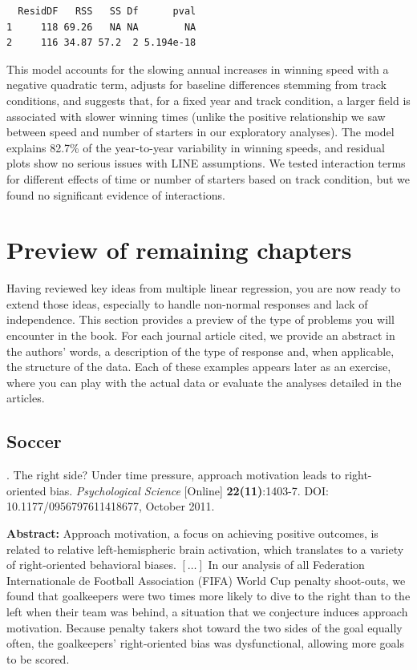 \documentclass[
]{krantz}
\renewenvironment{quote}{\begin{VF}}{\end{VF}}
\begin{document}
\begin{verbatim}
  ResidDF   RSS   SS Df      pval
1     118 69.26   NA NA        NA
2     116 34.87 57.2  2 5.194e-18
\end{verbatim}

This model accounts for the slowing annual increases in winning speed with a negative quadratic term, adjusts for baseline differences stemming from track conditions, and suggests that, for a fixed year and track condition, a larger field is associated with slower winning times (unlike the positive relationship we saw between speed and number of starters in our exploratory analyses). The model explains 82.7\% of the year-to-year variability in winning speeds, and residual plots show no serious issues with LINE assumptions. We tested interaction terms for different effects of time or number of starters based on track condition, but we found no significant evidence of interactions.

\hypertarget{preview-of-remaining-chapters}{%
\section{Preview of remaining chapters}\label{preview-of-remaining-chapters}}

Having reviewed key ideas from multiple linear regression, you are now ready to extend those ideas, especially to handle non-normal responses and lack of independence. This section provides a preview of the type of problems you will encounter in the book. For each journal article cited, we provide an abstract in the authors' words, a description of the type of response and, when applicable, the structure of the data. Each of these examples appears later as an exercise, where you can play with the actual data or evaluate the analyses detailed in the articles.

\hypertarget{soccer}{%
\subsection{Soccer}\label{soccer}}

\citet{Roskes2011} . The right side? Under time pressure, approach motivation leads to right-oriented bias. \emph{Psychological Science} {[}Online{]} \textbf{22(11)}:1403-7. DOI: 10.1177/0956797611418677, October 2011.

\begin{quote}
\textbf{Abstract:} Approach motivation, a focus on achieving positive outcomes, is related to relative left-hemispheric brain activation, which translates to a variety of right-oriented behavioral biases. \([\ldots]\) In our analysis of all Federation Internationale de Football Association (FIFA) World Cup penalty shoot-outs, we found that goalkeepers were two times more likely to dive to the right than to the left when their team was behind, a situation that we conjecture induces approach motivation. Because penalty takers shot toward the two sides of the goal equally often, the goalkeepers' right-oriented bias was dysfunctional, allowing more goals to be scored.
\end{quote}
\end{document}
